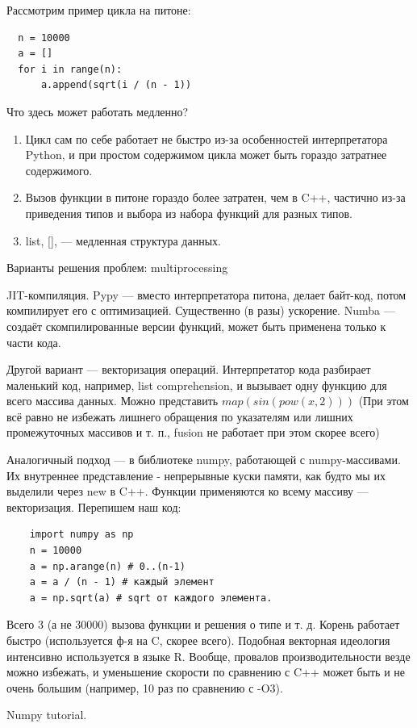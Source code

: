 \documentclass{book}
\begin{document}
Рассмотрим пример цикла на питоне:
\begin{verbatim}
  n = 10000
  a = []
  for i in range(n):
      a.append(sqrt(i / (n - 1))
\end{verbatim}
Что здесь может работать медленно?
\begin{enumerate}
    \item Цикл сам по себе работает не быстро из-за особенностей интерпретатора
        Python, и при простом содержимом цикла может быть гораздо затратнее
        содержимого.
    \item Вызов функции в питоне гораздо более затратен, чем в C++, частично
        из-за приведения типов и выбора из набора функций для разных типов.
    \item list, [], --- медленная структура данных.
\end{enumerate}

Варианты решения проблем: multiprocessing

JIT-компиляция. Pypy --- вместо интерпретатора питона, делает байт-код, потом компилирует его с
оптимизацией. Существенно (в разы) ускорение. Numba --- создаёт скомпилированные версии функций,
может быть применена только к части кода.

Другой вариант --- векторизация операций. Интерпретатор кода разбирает маленький код, например,
list comprehension, и вызывает одну функцию для всего массива данных. Можно представить $map(sin(pow(x, 2)))$ (При этом всё равно не
избежать лишнего обращения по указателям или лишних промежуточных массивов и т. п., fusion не работает при этом скорее всего)

Аналогичный подход --- в библиотеке numpy, работающей с numpy-массивами. Их внутреннее представление - непрерывные куски памяти, как будто
мы их выделили через new в C++. Функции применяются ко всему массиву --- векторизация. Перепишем наш код:
\begin{verbatim}
    import numpy as np
    n = 10000
    a = np.arange(n) # 0..(n-1)
    a = a / (n - 1) # каждый элемент
    a = np.sqrt(a) # sqrt от каждого элемента.
\end{verbatim}
Всего 3 (а не 30000) вызова функции и решения о типе и т. д. Корень работает
быстро (используется ф-я на C, скорее всего). Подобная векторная идеология
интенсивно используется в языке R. Вообще, провалов производительности везде
можно избежать, и уменьшение скорости по сравнению с C++ может быть и не очень
большим (например, 10 раз по сравнению с -O3).

Numpy tutorial.
\inputminted{python}{numpy_tutorial.py}
\end{document}
